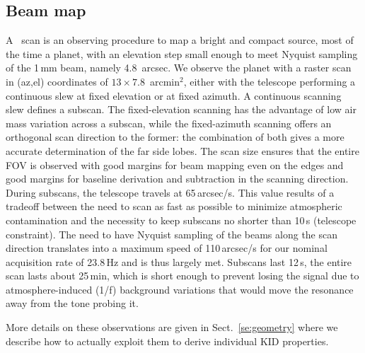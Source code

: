 

\subsection{Beam map}
\label{se:beammaps}

A \bm\ scan is an observing procedure to map a bright and compact
source, most of the time a planet, with
an elevation step small enough to meet Nyquist sampling of the 1\,mm beam,
namely 4.8~arcsec. We observe the planet with a raster scan in (az,el)
coordinates of $13\times7.8$~arcmin$^2$, either with the telescope
performing a continuous slew at fixed elevation or at fixed azimuth. 
A continuous scanning slew defines a subscan. 
The fixed-elevation scanning has the advantage of low air mass variation
across a subscan, while the fixed-azimuth scanning offers an
orthogonal scan direction to the former:
the combination of both gives a more accurate determination of the far side
lobes. The scan size ensures that the entire FOV is observed with good margins
for beam mapping even on the edges and good margins for baseline derivation and
subtraction in the scanning direction. During subscans, the telescope travels at
65\,arcsec/s. This value results of a tradeoff between the need to scan as
fast as possible to minimize atmospheric contamination and the
necessity to keep subscans no shorter than 10\,s (telescope
constraint). The need to have Nyquist sampling of
the beams along the scan direction translates into a maximum speed of 110\,arcsec/s
for our nominal acquisition rate of 23.8\,Hz and is thus largely met. Subscans
last 12\,s, the entire scan lasts about 25\,min, which is short enough to prevent
losing the signal due to atmosphere-induced (1/f) background variations that would
move the resonance away from the tone probing it.

More details on these observations are given in Sect.~\ref{se:geometry}
where we describe how to actually exploit them to derive individual KID
properties.

